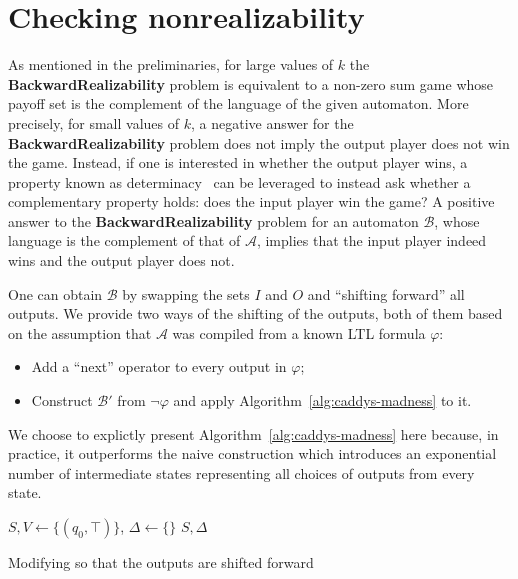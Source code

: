 \documentclass[runningheads,a4paper,draft]{llncs}
\begin{document}
\section{Checking nonrealizability}
As mentioned in the preliminaries, for large values of $k$ the 
\textbf{BackwardRealizability} problem is equivalent to a non-zero sum game
whose payoff set is the complement of the language of the given automaton.
More precisely, for small values of $k$, a negative answer for the
\textbf{BackwardRealizability} problem does not imply the output player does
not win the game. Instead, if one is interested in whether the output player
wins, a property known as determinacy~\cite{borel} can be leveraged to instead
ask whether a complementary property holds: does the input player win the
game? A positive answer to the \textbf{BackwardRealizability} problem for
an automaton $\mathcal{B}$, whose language is the complement of that of
$\mathcal{A}$, implies that the input player indeed wins and
the output player does not.

One can obtain $\mathcal{B}$ by swapping the sets $I$ and $O$ and ``shifting
forward'' all outputs. We provide two ways of the shifting of the outputs,
both of them based on the assumption that $\mathcal{A}$ was compiled from a
known LTL formula $\varphi$:
\begin{itemize}
  \item Add a ``next'' operator to every output in $\varphi$;
  \item Construct $\mathcal{B}'$ from $\lnot \varphi$ and apply
    Algorithm~\ref{alg:caddys-madness} to it.
\end{itemize}

We choose to explictly present Algorithm~\ref{alg:caddys-madness} here because, in
practice, it outperforms the naive construction which introduces an
exponential number of intermediate states representing all choices of outputs
from every state.

\begin{algorithm}

\BlankLine
\(S,V \leftarrow \{(q_0,\top)\}\), \(\Delta \leftarrow \{\}\)\;
\Return \(S,\Delta\)
\caption{Modifying \cA so that the outputs are shifted forward}
\label{alg:caddys-madness}
\end{algorithm}
\end{document}
